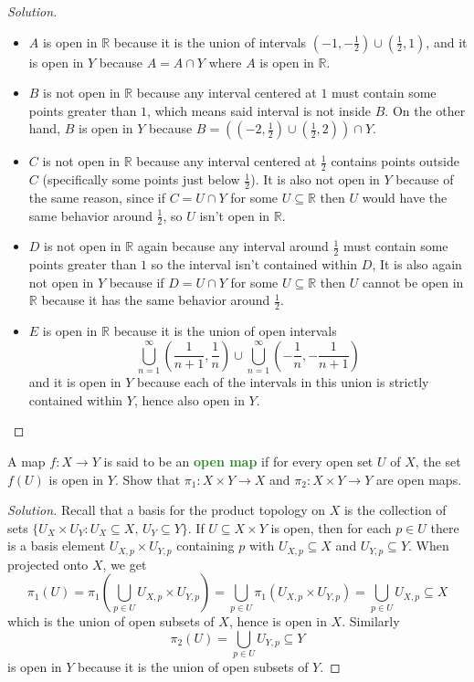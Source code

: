 \documentclass[11pt]{scrartcl}
\providecommand{\half}{\frac{1}{2}}
\providecommand{\RR}{\mathbb R}
\providecommand{\ii}{\item}
\newenvironment{soln}{\begin{proof}[Solution]}{\end{proof}}
\providecommand{\vocab}[1]{{\textbf{\textcolor{ForestGreen}{#1}}}}
\begin{document}
\begin{soln}
    \begin{itemize}
        \ii $A$ is open in $\RR$ because it is the union of intervals
	$(-1,-\half)\cup(\half,1)$, and it is open in $Y$
	because $A = A\cap Y$ where $A$ is open in $\RR$.
	\ii $B$ is not open in $\RR$ because any interval centered at $1$
	must contain some points greater than $1$,
	which means said interval is not inside $B$.
	On the other hand, $B$ is open in $Y$ because
	$B = ((-2,\half)\cup(\half,2))\cap Y$.
	\ii $C$ is not open in $\RR$ because any interval centered at $\half$
	contains points outside $C$ (specifically some points just below $\half$).
	It is also not open in $Y$ because of the same reason,
	since if $C = U\cap Y$ for some $U\subseteq\RR$ then
	$U$ would have the same behavior around $\half$,
	so $U$ isn't open in $\RR$.
	\ii $D$ is not open in $\RR$ again because any interval around $\half$
	must contain some points greater than $1$
	so the interval isn't contained within $D$,
	It is also again not open in $Y$ because
	if $D = U\cap Y$ for some $U\subseteq\RR$ then $U$ cannot be open in $\RR$
	because it has the same behavior around $\half$.
	\ii $E$ is open in $\RR$ because it is the union of open intervals
	\begin{equation*}
	    \bigcup_{n=1}^\infty \left(\frac1{n+1},\frac1n\right)\cup
	    \bigcup_{n=1}^\infty \left(-\frac1{n},-\frac1{n+1}\right)
	\end{equation*}
	and it is open in $Y$ because each of the intervals in this union
	is strictly contained within $Y$, hence also open in $Y$.
    \end{itemize}
\end{soln}

\begin{problem*}
    [Munkres 16.4]
    A map $f\colon X\to Y$ is said to be an \vocab{open map} if
    for every open set $U$ of $X$, the set $f(U)$ is open in $Y$.
    Show that $\pi_1\colon X\times Y\to X$ and $\pi_2\colon X\times Y\to Y$
    are open maps.
\end{problem*}

\begin{soln}
    Recall that a basis for the product topology on $X$
    is the collection of sets $\{U_X\times U_Y : U_X\subseteq X,\, U_Y\subseteq Y\}$.
    If $U\subseteq X\times Y$ is open, then for each $p\in U$
    there is a basis element $U_{X,p}\times U_{Y,p}$ containing $p$
    with $U_{X,p}\subseteq X$ and $U_{Y,p}\subseteq Y$.
    When projected onto $X$, we get
    \begin{equation*}
	\pi_1(U) = \pi_1\left(\bigcup_{p\in U}U_{X,p}\times U_{Y,p}\right)
	= \bigcup_{p\in U}\pi_1(U_{X,p}\times U_{Y,p})
	= \bigcup_{p\in U}U_{X,p}\subseteq X
    \end{equation*}
    which is the union of open subsets of $X$, hence is open in $X$.
    Similarly
    \begin{equation*}
	\pi_2(U) = \bigcup_{p\in U}U_{Y,p}\subseteq Y
    \end{equation*}
    is open in $Y$ because it is the union of open subsets of $Y$.
\end{soln}
\end{document}
